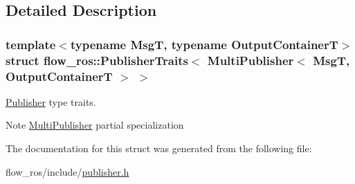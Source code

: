 \subsection{Detailed Description}
\subsubsection*{template$<$typename MsgT, typename Output\+ContainerT$>$\newline
struct flow\+\_\+ros\+::\+Publisher\+Traits$<$ Multi\+Publisher$<$ Msg\+T, Output\+Container\+T $>$ $>$}

\hyperlink{classflow__ros_1_1_publisher}{Publisher} type traits. 

\begin{DoxyNote}{Note}
\hyperlink{classflow__ros_1_1_multi_publisher}{Multi\+Publisher} partial specialization 
\end{DoxyNote}


The documentation for this struct was generated from the following file\+:\begin{DoxyCompactItemize}
\item 
flow\+\_\+ros/include/\hyperlink{publisher_8h}{publisher.\+h}\end{DoxyCompactItemize}
